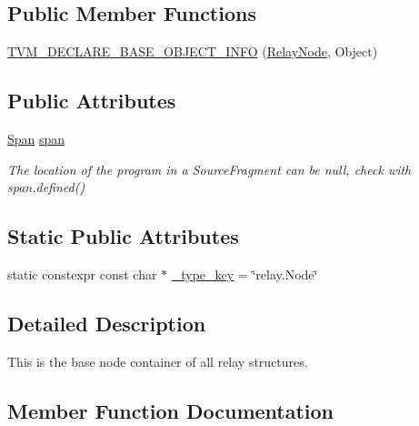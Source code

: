 \subsection*{Public Member Functions}
\begin{DoxyCompactItemize}
\item 
\hyperlink{classtvm_1_1relay_1_1RelayNode_af61323189c9e15411934e05ac86547ca}{T\+V\+M\+\_\+\+D\+E\+C\+L\+A\+R\+E\+\_\+\+B\+A\+S\+E\+\_\+\+O\+B\+J\+E\+C\+T\+\_\+\+I\+N\+FO} (\hyperlink{classtvm_1_1relay_1_1RelayNode}{Relay\+Node}, Object)
\end{DoxyCompactItemize}
\subsection*{Public Attributes}
\begin{DoxyCompactItemize}
\item 
\hyperlink{namespacetvm_1_1relay_af40ca6124bc2e88f2323eeb79d326cc0}{Span} \hyperlink{classtvm_1_1relay_1_1RelayNode_aa071442f5359c04aef5692334ce784c7}{span}
\begin{DoxyCompactList}\small\item\em The location of the program in a Source\+Fragment can be null, check with span.\+defined() \end{DoxyCompactList}\end{DoxyCompactItemize}
\subsection*{Static Public Attributes}
\begin{DoxyCompactItemize}
\item 
static constexpr const char $\ast$ \hyperlink{classtvm_1_1relay_1_1RelayNode_a516a8bf6554da1636323c308161495be}{\+\_\+type\+\_\+key} = \char`\"{}relay.\+Node\char`\"{}
\end{DoxyCompactItemize}


\subsection{Detailed Description}
This is the base node container of all relay structures. 

\subsection{Member Function Documentation}
